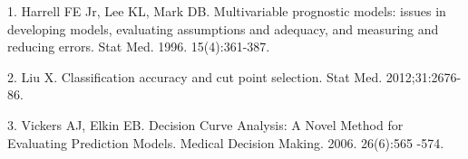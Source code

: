  1. Harrell FE Jr, Lee KL, Mark DB. Multivariable prognostic models: issues in developing models, evaluating assumptions and adequacy, and measuring and reducing errors. Stat Med. 1996. 15(4):361-387. 



2. Liu X. Classification accuracy and cut point selection. Stat Med. 2012;31:2676-86.



3. Vickers AJ, Elkin EB. Decision Curve Analysis: A Novel Method for Evaluating Prediction Models. Medical Decision Making. 2006. 26(6):565 -574. 





%

%
